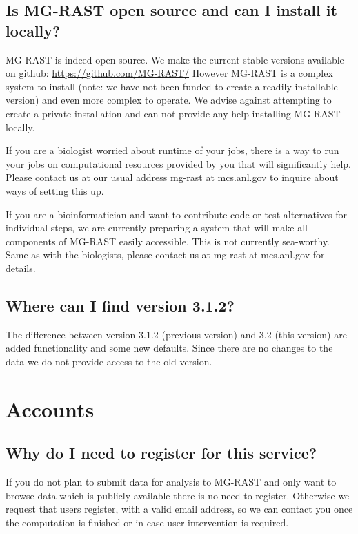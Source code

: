 \documentclass[12pt,fullpage]{report}
\begin{document}
\subsection{Is MG-RAST open source and can I install it locally?}
MG-RAST is indeed open source. We make the current stable versions available on github: \url{https://github.com/MG-RAST/}
However MG-RAST is a complex system to install (note: we have not been funded to create a readily installable version) and even more complex to operate. We advise against attempting to create a private installation and can not provide any help installing MG-RAST locally.

If you are a biologist worried about runtime of your jobs, there is a way to run your jobs on computational resources provided by you that will significantly help. Please contact us at our usual address mg-rast at mcs.anl.gov to inquire about ways of setting this up.

If you are a bioinformatician and want to contribute code or test alternatives for individual steps, we are currently preparing a system that will make all components of MG-RAST easily accessible. This is not currently sea-worthy. Same as with the biologists, please contact us at mg-rast at mcs.anl.gov for details.
\subsection{Where can I find version 3.1.2?}
The difference between version 3.1.2 (previous version) and 3.2 (this version) are added functionality and some new defaults. Since there are no changes to the data we do not provide access to the old version.
\section{Accounts}
\subsection{Why do I need to register for this service?}
If you do not plan to submit data for analysis to MG-RAST and only want to browse data which is publicly available there is no need to register. Otherwise we request that users register, with a valid email address, so we can contact you once the computation is finished or in case user intervention is required.
\end{document}
